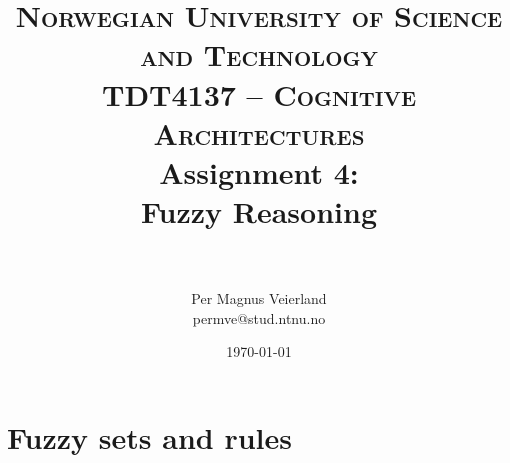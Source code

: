 

\usepackage{mathtools}
\usepackage{relsize}

\title{
\normalfont \normalsize
\textsc{Norwegian University of Science and Technology\\TDT4137 -- Cognitive Architectures}
\horrule{0.5pt} \\[0.4cm]
\huge Assignment 4:\\ Fuzzy Reasoning\\
\horrule{2pt} \\[0.5cm]
}

\author{Per Magnus Veierland\\permve@stud.ntnu.no}

\date{\normalsize\today}




\maketitle

\section*{Fuzzy sets and rules}

